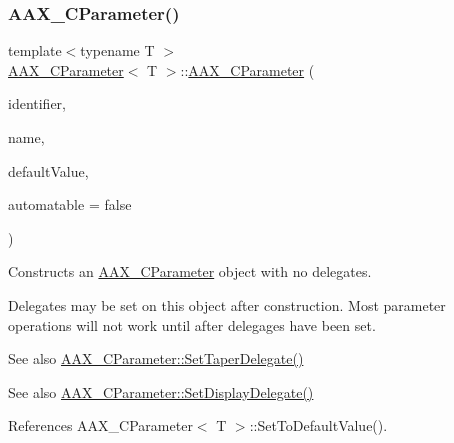 \subsubsection{\texorpdfstring{AAX\_CParameter()}{AAX\_CParameter()}\hspace{0.1cm}{\footnotesize\ttfamily [3/4]}}
{\footnotesize\ttfamily template$<$typename T $>$ \\
\mbox{\hyperlink{a01537}{A\+A\+X\+\_\+\+C\+Parameter}}$<$ T $>$\+::\mbox{\hyperlink{a01537}{A\+A\+X\+\_\+\+C\+Parameter}} (\begin{DoxyParamCaption}\item[{const \mbox{\hyperlink{a01873}{A\+A\+X\+\_\+\+I\+String}} \&}]{identifier,  }\item[{const \mbox{\hyperlink{a01873}{A\+A\+X\+\_\+\+I\+String}} \&}]{name,  }\item[{T}]{default\+Value,  }\item[{bool}]{automatable = {\ttfamily false} }\end{DoxyParamCaption})}



Constructs an \mbox{\hyperlink{a01537}{A\+A\+X\+\_\+\+C\+Parameter}} object with no delegates. 

Delegates may be set on this object after construction. Most parameter operations will not work until after delegages have been set.


\begin{DoxyItemize}
\item \begin{DoxySeeAlso}{See also}
\mbox{\hyperlink{a01537_a73951bf97667382f01103a9230ce0c3e}{A\+A\+X\+\_\+\+C\+Parameter\+::\+Set\+Taper\+Delegate()}}
\end{DoxySeeAlso}

\item \begin{DoxySeeAlso}{See also}
\mbox{\hyperlink{a01537_a75619ec0a487c28966dc5448e4d2ab05}{A\+A\+X\+\_\+\+C\+Parameter\+::\+Set\+Display\+Delegate()}} 
\end{DoxySeeAlso}

\end{DoxyItemize}

References A\+A\+X\+\_\+\+C\+Parameter$<$ T $>$\+::\+Set\+To\+Default\+Value().

